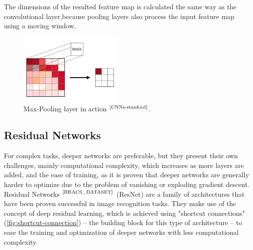 \documentclass[
11pt, %
english, %
singlespacing, %
headsepline, %
]{project_structure}
\begin{document}
\noindent The dimensions of the resulted feature map is calculated the same way as the convolutional layer,because pooling layers also process the input feature map using a moving window.

\begin{figure}[H]
    \centering
    \includegraphics[width=0.45\textwidth]{figures/background/max-pooling-a.png}
    \caption{Max-Pooling layer in action $^{\text{\cite{CNNs-stanford}}}$.}
\end{figure}

\subsection{Residual Networks}

\noindent For complex tasks, deeper networks are preferable, but they present their own challenges, mainly computational complexity, which increases as more layers are added, and the ease of training, as it is proven that deeper networks are generally harder to optimize due to the problem of vanishing or exploding gradient descent.\\

\noindent Residual Networks $^{\text{\cite{BRACS_DATASET}}}$ (\acrshort{ResNet}) are a family of architectures that have been proven successful in image recognition tasks. They make use of the concept of deep residual learning, which is achieved using "shortcut connections" (\autoref{fig:shortcut-connection}) – the building block for this type of architecture – to ease the training and optimization of deeper networks with less computational complexity.\\
\end{document}
